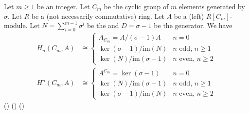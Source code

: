 \begin{proposition} \label{proposition:group_homology_cohomology_for_cyclic_group}
    Let $m \geq 1$ be an integer. Let $C_m$ be the cyclic group of $m$ elements generated by $\sigma$. Let $R$ be a (not necessarily commutative) ring. Let $A$ be a (left) $R[C_m]$-module. Let $N = \sum_{i=0}^{m-1} \sigma^i$ be the  and $D = \sigma - 1$ be the  generator. We have
    \begin{align*}
        H_n(C_m, A) &\cong \begin{cases} 
            A_{C_m} = A/(\sigma-1)A & n = 0 \\
            \ker(\sigma-1)/\text{im}(N) & n \text{ odd, } n \geq 1 \\
            \ker(N)/\text{im}(\sigma-1) & n \text{ even, } n \geq 2 
        \end{cases} \\
        H^n(C_m, A) &\cong \begin{cases} 
            A^{C_m} = \ker(\sigma-1) & n = 0 \\
            \ker(N)/\text{im}(\sigma-1) & n \text{ odd, } n \geq 1 \\
            \ker(\sigma-1)/\text{im}(N) & n \text{ even, } n \geq 2 
        \end{cases}
    \end{align*}
    () () ()
\end{proposition}
